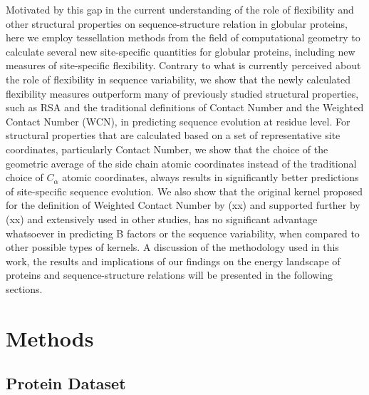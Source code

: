 \documentclass[11pt]{article}
\begin{document}
    Motivated by this gap in the current understanding of the role of flexibility and other structural properties on sequence-structure relation in globular proteins, here we employ tessellation methods from the field of computational geometry to calculate several new site-specific quantities for globular proteins, including new measures of site-specific flexibility. Contrary to what is currently perceived about the role of flexibility in sequence variability, we show that the newly calculated flexibility measures outperform many of previously studied structural properties, such as RSA and the traditional definitions of Contact Number and the Weighted Contact Number (WCN), in predicting sequence evolution at residue level.  For structural properties that are calculated based on a set of representative site coordinates, particularly Contact Number, we show that the choice of the geometric average of the side chain atomic coordinates instead of the traditional choice of $C_\alpha$ atomic coordinates, always results in significantly better predictions of site-specific sequence evolution. We also show that the original kernel proposed for the definition of Weighted Contact Number by (xx) and supported further by (xx) and extensively used in other studies, has no significant advantage whatsoever in predicting B factors or the sequence variability, when compared to other possible types of kernels. A discussion of the methodology used in this work, the results and implications of our findings on the energy landscape of proteins and sequence-structure relations will be presented in the following sections.  \\

\section{Methods}
\label{sec:methods}

    \subsection*{Protein Dataset}
\end{document}
